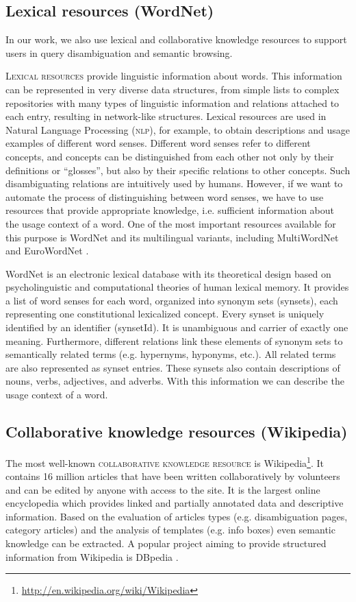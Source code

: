 \documentclass[output=paper]{LSP/langsci}
\begin{document}
\subsection{Lexical resources (WordNet)}\label{LexRes}
In our work, we also use lexical and collaborative knowledge resources to support users in query disambiguation and semantic browsing.\par
\textsc{Lexical resources} provide linguistic information about words. This information can be represented in very diverse data structures, from simple lists to complex repositories with many types of linguistic information and relations attached to each entry, resulting in network-like structures. Lexical resources are used in Natural Language Processing (\textsc{nlp}), for example, to obtain descriptions and usage examples of different word senses. Different word senses refer to different concepts, and concepts can be distinguished from each other not only by their definitions or ``glosses'', but also by their specific relations to other concepts. Such disambiguating relations are intuitively used by humans. However, if we want to automate the process of distinguishing between word senses, we have to use resources that provide appropriate knowledge, i.e. sufficient information about the usage context of a word. One of the most important resources available for this purpose is WordNet \citet{Fel98} and its multilingual variants, including MultiWordNet \citet{Pianta02} and EuroWordNet \citet{Vossen99}.\par
WordNet \citet{Fel98} is an electronic lexical database with its theoretical design based on  psycholinguistic and computational theories of human lexical memory. It provides a list of word senses for each word, organized into synonym sets (synsets), each representing one constitutional lexicalized concept. Every synset is uniquely identified by an identifier (synsetId). It is unambiguous and carrier of exactly one meaning. Furthermore, different relations link these elements of synonym sets to semantically related terms (e.g. hypernyms, hyponyms, etc.). All related terms are also represented as synset entries. These synsets also contain descriptions of nouns, verbs, adjectives, and adverbs. With this information we can describe the usage context of a word. 

\subsection{Collaborative knowledge resources (Wikipedia)}\label{KnoRes}
The most well-known \textsc{collaborative knowledge resource} is Wikipedia\footnote{\url{http://en.wikipedia.org/wiki/Wikipedia}}. It contains 16 million articles that have been written collaboratively by volunteers and can be edited by anyone with access to the site. It is the largest online encyclopedia which provides linked and partially annotated data and descriptive information. Based on the evaluation of articles types (e.g. disambiguation pages, category articles) and the analysis of templates (e.g. info boxes) even semantic knowledge can be extracted. A popular project aiming to provide structured information from Wikipedia is \textsc{DB}pedia \citet{dbpedia}.
\end{document}
